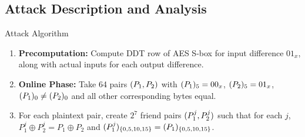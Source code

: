 \documentclass[notheorems]{beamer}
\theoremstyle{definition}
\theoremstyle{example}
\begin{document}
    \subsection{Attack Description and Analysis}
    \label{sec:retr-boomerang-algo}
    \begin{frame}[<+->]{Attack Algorithm}
        \begin{enumerate}
            \item \textbf{Precomputation:} Compute DDT row of AES S-box for
            input difference \(01_x\), along with actual inputs for each output
            difference.
            \item \textbf{Online Phase:} Take 64 pairs \((P_1, P_2)\) with
            \((P_1)_5 = 00_x\), \((P_2)_5 = 01_x\), \((P_1)_0 \ne
            (P_2)_0\) and all other corresponding bytes equal.
            \item For each plaintext pair, create \(2^7\) friend pairs
            \((P_1^j, P_2^j)\) such that for each \(j\), \(P_1^j \oplus
            P_2^j = P_1 \oplus P_2\) and \((P_1^j)_{\{0, 5, 10, 15\}} =
            (P_1)_{\{0, 5, 10, 15\}}\).
            \seti
        \end{enumerate}
    \end{frame}
\end{document}
